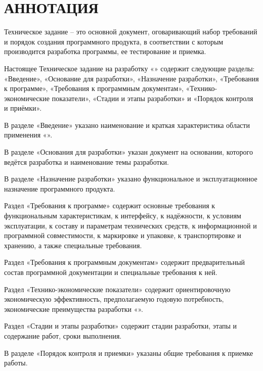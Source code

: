 \section*{АННОТАЦИЯ}

Техническое задание – это основной документ, оговаривающий набор требований и
порядок создания программного продукта, в соответствии с которым производится разработка
программы, ее тестирование и приемка.

Настоящее Техническое задание на разработку «\docTitleGenitive» содержит следующие разделы: «Введение», «Основание для разработки», «Назначение разработки», «Требования к программе», «Требования к программным документам», «Технико-экономические показатели», «Стадии и этапы разработки» и «Порядок контроля и приёмки».

В разделе «Введение» указано наименование и краткая характеристика области применения «\docTitleGenitive».

В разделе «Основания для разработки» указан документ на основании, которого ведётся разработка и наименование темы разработки.

В разделе «Назначение разработки» указано функциональное и эксплуатационное назначение программного продукта.

Раздел «Требования к программе» содержит основные требования к функциональным характеристикам, к интерфейсу, к надёжности, к условиям эксплуатации, к составу и параметрам технических средств, к информационной и программной совместимости, к маркировке и упаковке, к транспортировке и хранению, а также специальные требования.

Раздел «Требования к программным документам» содержит предварительный состав программной документации и специальные требования к ней.

Раздел «Технико-экономические показатели» содержит ориентировочную экономическую эффективность, предполагаемую годовую потребность, экономические преимущества разработки «\docTitleGenitive».

Раздел «Стадии и этапы разработки» содержит стадии разработки, этапы и содержание работ, сроки выполнения.

В разделе «Порядок контроля и приемки» указаны общие требования к приемке работы.

